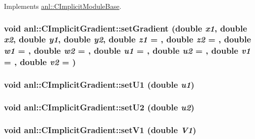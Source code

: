 Implements \hyperlink{classanl_1_1CImplicitModuleBase_ab88f8a1822dcfbc13ba5230318b0acd1}{anl::CImplicitModuleBase}.\hypertarget{classanl_1_1CImplicitGradient_ac24f690633c2fa077e04dd140c3adc93}{
\subsubsection[{setGradient}]{\setlength{\rightskip}{0pt plus 5cm}void anl::CImplicitGradient::setGradient (double {\em x1}, \/  double {\em x2}, \/  double {\em y1}, \/  double {\em y2}, \/  double {\em z1} = {}, \/  double {\em z2} = {}, \/  double {\em w1} = {}, \/  double {\em w2} = {}, \/  double {\em u1} = {}, \/  double {\em u2} = {}, \/  double {\em v1} = {}, \/  double {\em v2} = {})}}
\label{classanl_1_1CImplicitGradient_ac24f690633c2fa077e04dd140c3adc93}
\hypertarget{classanl_1_1CImplicitGradient_ae5cb2ee2f2899f2a60707b0f10dbcf7c}{
\subsubsection[{setU1}]{\setlength{\rightskip}{0pt plus 5cm}void anl::CImplicitGradient::setU1 (double {\em u1})}}
\label{classanl_1_1CImplicitGradient_ae5cb2ee2f2899f2a60707b0f10dbcf7c}
\hypertarget{classanl_1_1CImplicitGradient_aefc10b99819384660f8d759fdef439d8}{
\subsubsection[{setU2}]{\setlength{\rightskip}{0pt plus 5cm}void anl::CImplicitGradient::setU2 (double {\em u2})}}
\label{classanl_1_1CImplicitGradient_aefc10b99819384660f8d759fdef439d8}
\hypertarget{classanl_1_1CImplicitGradient_a69033f6c71e0331b79df6841b6172de7}{
\subsubsection[{setV1}]{\setlength{\rightskip}{0pt plus 5cm}void anl::CImplicitGradient::setV1 (double {\em V1})}}

